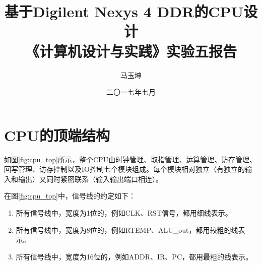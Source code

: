 \documentclass[forprint]{WHUBachelor}
\begin{document}

\title{基于Digilent Nexys 4 DDR的CPU设计\\ {\Large《计算机设计与实践》实验五报告}}
\author{马玉坤}                            %
\date{二〇一七年七月}                    %

\frontmatter
{}              %
\tableofcontents
\mainmatter %

\chapter{CPU的顶端结构}

如图\ref{fig:cpu_top}所示，整个CPU由时钟管理、取指管理、运算管理、访存管理、回写管理、访存控制以及IO控制七个模块组成。每个模块相对独立（有独立的输入和输出）又同时紧密联系（输入输出端口相连）。

在图\ref{fig:cpu_top}中，信号线的约定如下：
\begin{enumerate}[1)]
\item 所有信号线中，宽度为1位的，例如CLK、RST信号，都用细线表示。
\item 所有信号线中，宽度为8位的，例如RTEMP、ALU\_out，都用较粗的线表示。
\item 所有信号线中，宽度为16位的，例如ADDR、IR、PC，都用最粗的线表示。
\end{enumerate}
\end{document}
